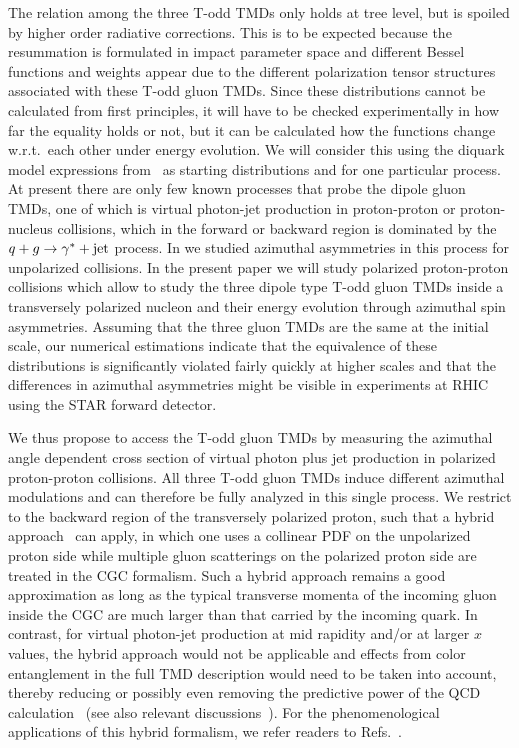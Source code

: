 \documentclass[prd,aps,preprintnumbers,fleqn,showpacs,nofootinbib,superscriptaddress]{revtex4}
\begin{document}
  The relation among the three T-odd TMDs only holds at tree level, but is spoiled by higher order radiative corrections. This is to be expected because the resummation is formulated in impact parameter space and different Bessel functions and weights appear due to the different polarization tensor structures associated with these T-odd gluon TMDs. Since these distributions cannot be calculated from first principles, it will have to be checked experimentally in how far the equality holds or not, but it can be calculated how the functions change w.r.t.\ each other under energy evolution. We will consider this using the 
 diquark model expressions from~\cite{Szymanowski:2016mbq} as starting distributions and for one particular process. 
  At present there are only few known processes that probe the dipole gluon TMDs, one of which is virtual photon-jet production in proton-proton or proton-nucleus collisions, which in the forward or backward region is dominated by the $q+g \rightarrow \gamma^*+{\rm jet}$ process. In \cite{Boer:2017xpy} we studied azimuthal asymmetries in this process for unpolarized collisions. In the present paper we will study polarized proton-proton collisions which allow to study the three dipole type T-odd gluon TMDs inside a transversely polarized nucleon and their energy evolution through azimuthal spin asymmetries. Assuming that the three gluon TMDs are the same at the initial scale, our numerical estimations indicate that the equivalence of these distributions is significantly violated fairly quickly at higher scales and that the differences in azimuthal asymmetries might be visible in experiments at RHIC using the STAR forward detector.
  
 
  We thus propose to access the T-odd gluon TMDs by measuring the azimuthal angle dependent cross section of virtual photon plus jet production in polarized proton-proton collisions. All three T-odd gluon TMDs induce different azimuthal modulations and can therefore be fully analyzed in this single process. We restrict to the backward region of the transversely polarized proton, such that a hybrid approach~\cite{Gelis:2002ki} can apply, in which one uses a collinear PDF on the unpolarized proton side while multiple gluon scatterings on the polarized proton side are treated in the CGC formalism. Such a hybrid approach remains a good approximation as long as the typical transverse momenta of the incoming gluon inside the CGC are much larger than that carried by the incoming quark. In contrast, for virtual photon-jet production at mid rapidity and/or at larger $x$ values, 
  the hybrid approach would not be applicable and effects from color entanglement in the full TMD description would need to be taken into account, thereby reducing or possibly even removing the predictive power of the QCD calculation~\cite{Collins:2007nk,Rogers:2010dm} (see also relevant discussions~\cite{Schafer:2014xpa,Zhou:2017mpw,Buffing:2018ggv}). For the phenomenological applications of this hybrid formalism, we refer readers to Refs.~\cite{Akcakaya:2012si,Schafer:2014xpa,Kotko:2015ura,Boer:2017xpy,Marquet:2017xwy,Dumitru:2018kuw,vanHameren:2020rqt,Altinoluk:2019fui,Fujii:2020bkl,Altinoluk:2021ygv}. 
\end{document}
